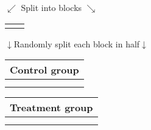 \documentclass{beamer}
\begin{document}
\newcommand{\low}[1]{{\color{blue}#1}}
\newcommand{\high}[1]{{\color{red}#1}}



\newcommand{\control}[0]{\begin{tabular}{cc}
\multicolumn{2}{l}{Control group} \\\hline
\vspace{-3mm}\\
\randlowcontrol &
\randhighcontrol
\end{tabular}}%

\newcommand{\treatment}[0]{\begin{tabular}{cc}
\multicolumn{2}{l}{Treatment group} \\\hline
\vspace{-3mm}\\
\randlowtreatment &
\randhightreatment
\end{tabular}}%

\newcommand{\slidea}[0]{\unsorted} %
\newcommand{\slideb}[0]{$\swarrow$ \hspace{10mm}Split into blocks\hspace{10mm} $\searrow$ \\
\begin{tabular}{cc}
\lowrisk&\highrisk
\end{tabular}} %

\newcommand{\slidec}[0]{$\downarrow$\hspace{5mm}Randomly split each block in half\hspace{5mm}$\downarrow$\\
\control%

\treatment} %

\begin{frame}
\begin{example}
\begin{center}
\slidea\pause

\slideb\pause

\slidec%
\end{center}
\end{example}
\end{frame}
\end{document}
